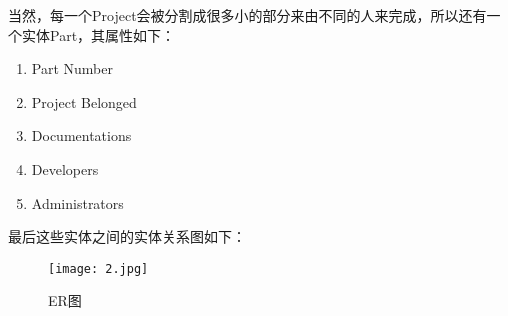 \documentclass[UTF8]{ctexart}
\begin{document}
	当然，每一个Project会被分割成很多小的部分来由不同的人来完成，所以还有一个实体Part，其属性如下：
	\begin{enumerate}
		\item Part Number
		\item Project Belonged
		\item Documentations
		\item Developers
		\item Administrators
	\end{enumerate} 
	最后这些实体之间的实体关系图如下：
	\begin{figure}
		\texttt{[image: 2.jpg]}
		\caption{ER图}
	\end{figure}
\end{document}
